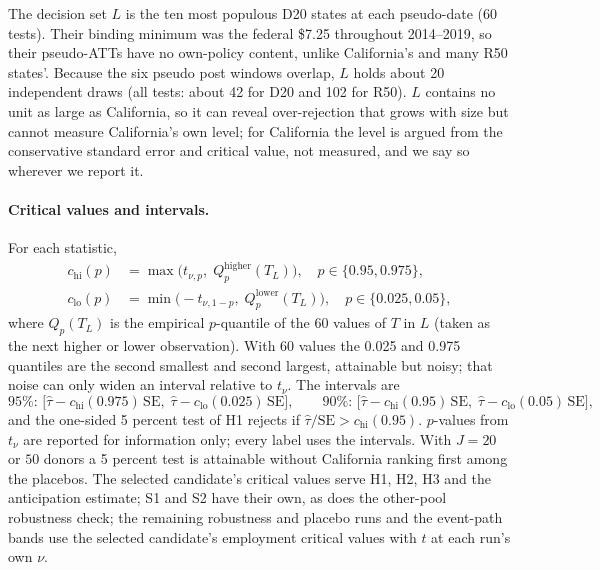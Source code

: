 The decision set $L$ is the ten most populous D20 states at each pseudo-date (60 tests). Their
binding minimum was the federal \$7.25 throughout 2014--2019, so their pseudo-ATTs have no
own-policy content, unlike California's and many R50 states'. Because the six pseudo post windows
overlap, $L$ holds about 20 independent draws (all tests: about 42 for D20 and 102 for R50). $L$
contains no unit as large as California, so it can reveal over-rejection that grows with size but
cannot measure California's own level; for California the level is argued from the conservative
standard error and critical value, not measured, and we say so wherever we report it.

\paragraph{Critical values and intervals.} For each statistic,
\begin{align}
c_{\mathrm{hi}}(p) &= \max\bigl(t_{\nu,p},\; Q^{\mathrm{higher}}_p(T_L)\bigr), \quad p \in \{0.95, 0.975\},\\
c_{\mathrm{lo}}(p) &= \min\bigl(-t_{\nu,1-p},\; Q^{\mathrm{lower}}_p(T_L)\bigr), \quad p \in \{0.025, 0.05\},
\end{align}
where $Q_p(T_L)$ is the empirical $p$-quantile of the 60 values of $T$ in $L$ (taken as the next
higher or lower observation). With 60 values the 0.025 and 0.975 quantiles are the second smallest
and second largest, attainable but noisy; that noise can only widen an interval relative to
$t_\nu$. The intervals are
\begin{equation}
\text{95\%: } \bigl[\hat\tau - c_{\mathrm{hi}}(0.975)\,\mathrm{SE},\; \hat\tau - c_{\mathrm{lo}}(0.025)\,\mathrm{SE}\bigr],
\qquad
\text{90\%: } \bigl[\hat\tau - c_{\mathrm{hi}}(0.95)\,\mathrm{SE},\; \hat\tau - c_{\mathrm{lo}}(0.05)\,\mathrm{SE}\bigr],
\end{equation}
and the one-sided 5 percent test of H1 rejects if $\hat\tau/\mathrm{SE} > c_{\mathrm{hi}}(0.95)$.
$p$-values from $t_\nu$ are reported for information only; every label uses the intervals. With
$J = 20$ or $50$ donors a 5 percent test is attainable without California ranking first among the
placebos. The selected candidate's critical values serve H1, H2, H3 and the anticipation estimate;
S1 and S2 have their own, as does the other-pool robustness check; the remaining robustness and
placebo runs and the event-path bands use the selected candidate's employment critical values with
$t$ at each run's own $\nu$.

